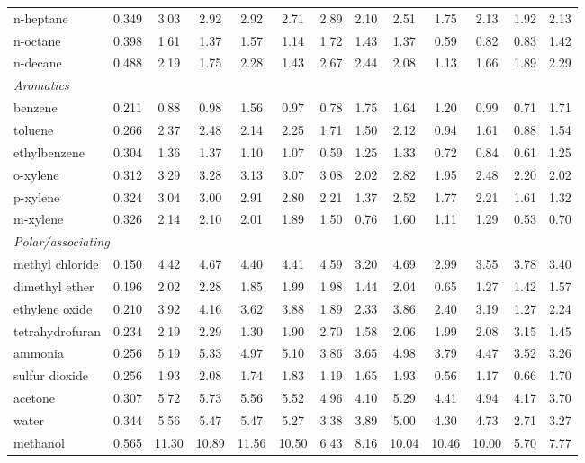 \begin{table}[H]
\begin{tabular}{lcccccccccccc}
n-heptane & 0.349 & 3.03 & 2.92 & 2.92 & 2.71 & 2.89 & 2.10 & 2.51 & 1.75 & 2.13 & 1.92 & 2.13 \\
n-octane & 0.398 & 1.61 & 1.37 & 1.57 & 1.14 & 1.72 & 1.43 & 1.37 & 0.59 & 0.82 & 0.83 & 1.42 \\
n-decane & 0.488 & 2.19 & 1.75 & 2.28 & 1.43 & 2.67 & 2.44 & 2.08 & 1.13 & 1.66 & 1.89 & 2.29 \\
\multicolumn{15}{l}{\emph{Aromatics}} \\
benzene & 0.211 & 0.88 & 0.98 & 1.56 & 0.97 & 0.78 & 1.75 & 1.64 & 1.20 & 0.99 & 0.71 & 1.71 \\
toluene & 0.266 & 2.37 & 2.48 & 2.14 & 2.25 & 1.71 & 1.50 & 2.12 & 0.94 & 1.61 & 0.88 & 1.54 \\
ethylbenzene & 0.304 & 1.36 & 1.37 & 1.10 & 1.07 & 0.59 & 1.25 & 1.33 & 0.72 & 0.84 & 0.61 & 1.25 \\
o-xylene & 0.312 & 3.29 & 3.28 & 3.13 & 3.07 & 3.08 & 2.02 & 2.82 & 1.95 & 2.48 & 2.20 & 2.02 \\
p-xylene & 0.324 & 3.04 & 3.00 & 2.91 & 2.80 & 2.21 & 1.37 & 2.52 & 1.77 & 2.21 & 1.61 & 1.32 \\
m-xylene & 0.326 & 2.14 & 2.10 & 2.01 & 1.89 & 1.50 & 0.76 & 1.60 & 1.11 & 1.29 & 0.53 & 0.70 \\
\multicolumn{15}{l}{\emph{Polar/associating}} \\
methyl chloride & 0.150 & 4.42 & 4.67 & 4.40 & 4.41 & 4.59 & 3.20 & 4.69 & 2.99 & 3.55 & 3.78 & 3.40 \\
dimethyl ether & 0.196 & 2.02 & 2.28 & 1.85 & 1.99 & 1.98 & 1.44 & 2.04 & 0.65 & 1.27 & 1.42 & 1.57 \\
ethylene oxide & 0.210 & 3.92 & 4.16 & 3.62 & 3.88 & 1.89 & 2.33 & 3.86 & 2.40 & 3.19 & 1.27 & 2.24 \\
tetrahydrofuran & 0.234 & 2.19 & 2.29 & 1.30 & 1.90 & 2.70 & 1.58 & 2.06 & 1.99 & 2.08 & 3.15 & 1.45 \\
ammonia & 0.256 & 5.19 & 5.33 & 4.97 & 5.10 & 3.86 & 3.65 & 4.98 & 3.79 & 4.47 & 3.52 & 3.26 \\
sulfur dioxide & 0.256 & 1.93 & 2.08 & 1.74 & 1.83 & 1.19 & 1.65 & 1.93 & 0.56 & 1.17 & 0.66 & 1.70 \\
acetone & 0.307 & 5.72 & 5.73 & 5.56 & 5.52 & 4.96 & 4.10 & 5.29 & 4.41 & 4.94 & 4.17 & 3.70 \\
water & 0.344 & 5.56 & 5.47 & 5.47 & 5.27 & 3.38 & 3.89 & 5.00 & 4.30 & 4.73 & 2.71 & 3.27 \\
methanol & 0.565 & 11.30 & 10.89 & 11.56 & 10.50 & 6.43 & 8.16 & 10.04 & 10.46 & 10.00 & 5.70 & 7.77 \\

\end{tabular}
\end{table}
